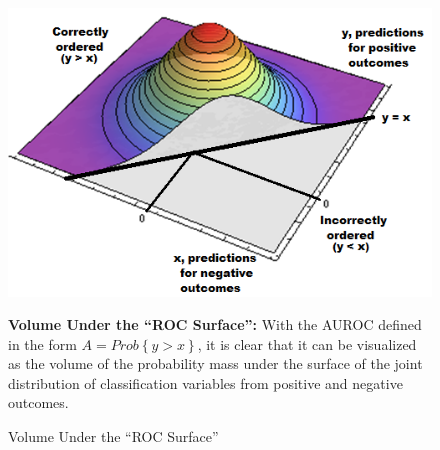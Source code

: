 


\begin{figure}[h!]

\begin{center}

    \caption{Volume Under the ``ROC Surface''} \label{fig:volume1}

    \includegraphics[scale=  0.500000]{Figs/Volume/AUROC_vol_3.png}

\end{center}

\footnotesize

    \textbf{Volume Under the ``ROC Surface'':}
    With the AUROC defined in the form $A = Prob{\left\{ y > x \right\}}$, it is clear that it can be visualized as the volume of the probability mass under the surface of the joint distribution of classification variables from positive and negative outcomes.

\end{figure}




